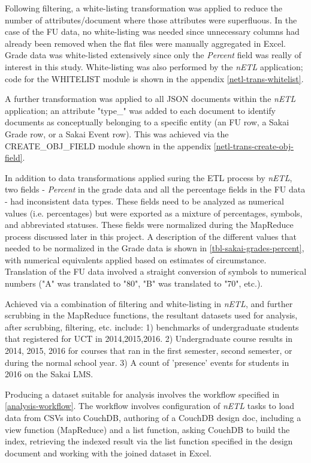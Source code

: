 Following filtering, a white-listing transformation was applied to reduce the number of attributes/document where those attributes were superfluous. In the case of the FU data, no white-listing was needed since unnecessary columns had already been removed when the flat files were manually aggregated in Excel. Grade data was white-listed extensively since only the \textit{Percent} field was really of interest in this study. White-listing was also performed by the \textit{nETL} application; code for the WHITELIST module is shown in the appendix \ref{netl-trans-whitelist}.

A further transformation was applied to all JSON documents within the \textit{nETL} application; an attribute "type\_" was added to each document to identify documents as conceptually belonging to a specific entity (an FU row, a Sakai Grade row, or a Sakai Event row). This was achieved via the CREATE\_OBJ\_FIELD module shown in the appendix \ref{netl-trans-create-obj-field}.

In addition to data transformations applied suring the ETL process by \textit{nETL}, two fields - \textit{Percent} in the grade data and all the percentage fields in the FU data - had inconsistent data types. These fields need to be analyzed as numerical values (i.e. percentages) but were exported as a mixture of percentages, symbols, and abbreviated statuses. These fields were normalized during the MapReduce process discussed later in this project. A description of the different values that needed to be normalized in the Grade data is shown in \ref{tbl-sakai-grades-percent}, with numerical equivalents applied based on estimates of circumstance. Translation of the FU data involved a straight conversion of symbols to numerical numbers ("A" was translated to "80", "B" was translated to "70", etc.).

Achieved via a combination of filtering and white-listing in \textit{nETL}, and further scrubbing in the MapReduce functions, the resultant datasets used for analysis, after scrubbing, filtering, etc. include: 1) benchmarks of undergraduate students that registered for UCT in 2014,2015,2016. 2) Undergraduate course results in 2014, 2015, 2016 for courses that ran in the first semester, second semester, or during the normal school year. 3) A count of 'presence' events for students in 2016 on the Sakai LMS.




Producing a dataset suitable for analysis involves the workflow specified in \ref{analysis-workflow}. The workflow involves configuration of \textit{nETL} tasks to load data from CSVs into CouchDB, authoring of a CouchDB design doc, including a view function (MapReduce) and a list function, asking CouchDB to build the index, retrieving the indexed result via the list function specified in the design document and working with the joined dataset in Excel.

